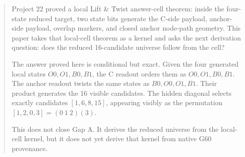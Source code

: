 \begin{abstract}
Project 22 proved a local Lift \& Twist answer-cell theorem: inside the four-state reduced target, two state bits generate the C-side payload, anchor-side payload, overlap markers, and closed anchor node-path geometry.  This paper takes that local-cell theorem as a kernel and asks the next derivation question: does the reduced 16-candidate universe follow from the cell?

The answer proved here is conditional but exact.  Given the four generated local states \(O0,O1,B0,B1\), the C readout orders them as \(O0,O1,B0,B1\).  The anchor readout twists the same states as \(B0,O0,O1,B1\).  Their product generates the 16 visible candidates.  The hidden diagonal selects exactly candidates \([1,6,8,15]\), appearing visibly as the permutation \([1,2,0,3]=(0\ 1\ 2)(3)\).

This does not close Gap A.  It derives the reduced universe from the local-cell kernel, but it does not yet derive that kernel from native G60 provenance.
\end{abstract}

